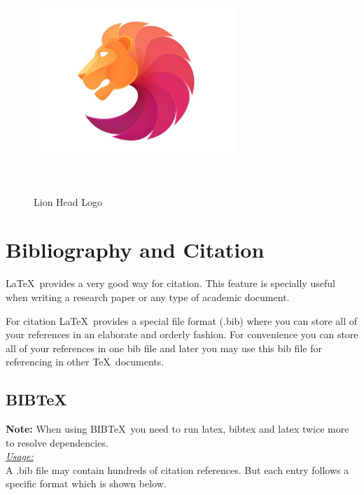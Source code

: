 \documentclass[12pt, twocolumn]{article}
\begin{document}
 \begin{center} \big\Downarrow \end{center}
\begin{center}
 \begin{figure}[htbp]
   \caption{Lion Head Logo}
   \includegraphics[width=3in, height=3in]{lion_head_logo.jpg}
   \label{fig:lion_logo}
 \end{figure}
\end{center}

   \pagebreak
   
 \section{Bibliography and Citation}
 \LaTeX\ provides a very good way for citation. This feature is specially useful when writing a research paper or any type of academic document.
 
 \noindent For citation \LaTeX\ provides a special file format (.bib) where you can store all of your references in an elaborate and orderly fashion. For convenience you can store all of your references in one bib file and later you may use this bib file for referencing in other \TeX\ documents. \\
 
 \subsection{BIB\TeX}
 \textbf{Note: } When using BIB\TeX\ you need to run latex, bibtex and latex twice more to resolve dependencies. \\
 
 \noindent \underline{\textit{Usage:}} \\
 
 \noindent A .bib file may contain hundreds of citation references. But each entry follows a specific format which is shown below. \\
\end{document}
